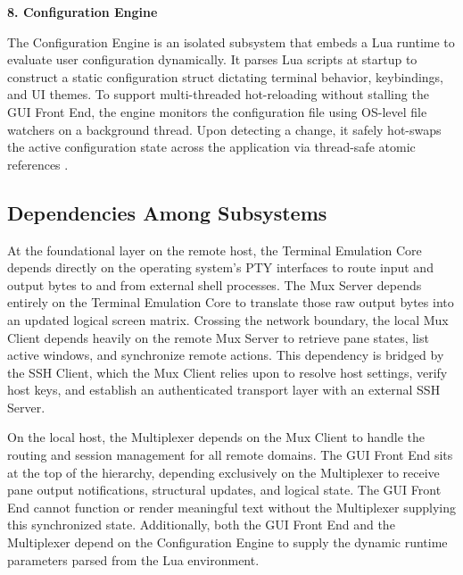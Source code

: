 \textbf{8. Configuration Engine}

The Configuration Engine is an isolated subsystem that embeds a Lua runtime to evaluate user configuration dynamically. It parses Lua scripts at startup to construct a static configuration struct dictating terminal behavior, keybindings, and UI themes. To support multi-threaded hot-reloading without stalling the GUI Front End, the engine monitors the configuration file using OS-level file watchers on a background thread. Upon detecting a change, it safely hot-swaps the active configuration state across the application via thread-safe atomic references \cite{config-crate}.

\subsection{Dependencies Among Subsystems}
\label{sec:dependencies}

At the foundational layer on the remote host, the Terminal Emulation Core depends directly on the operating system's PTY interfaces to route input and output bytes to and from external shell processes. The Mux Server depends entirely on the Terminal Emulation Core to translate those raw output bytes into an updated logical screen matrix. Crossing the network boundary, the local Mux Client depends heavily on the remote Mux Server to retrieve pane states, list active windows, and synchronize remote actions. This dependency is bridged by the SSH Client, which the Mux Client relies upon to resolve host settings, verify host keys, and establish an authenticated transport layer with an external SSH Server. 

On the local host, the Multiplexer depends on the Mux Client to handle the routing and session management for all remote domains. The GUI Front End sits at the top of the hierarchy, depending exclusively on the Multiplexer to receive pane output notifications, structural updates, and logical state. The GUI Front End cannot function or render meaningful text without the Multiplexer supplying this synchronized state. Additionally, both the GUI Front End and the Multiplexer depend on the Configuration Engine to supply the dynamic runtime parameters parsed from the Lua environment.

